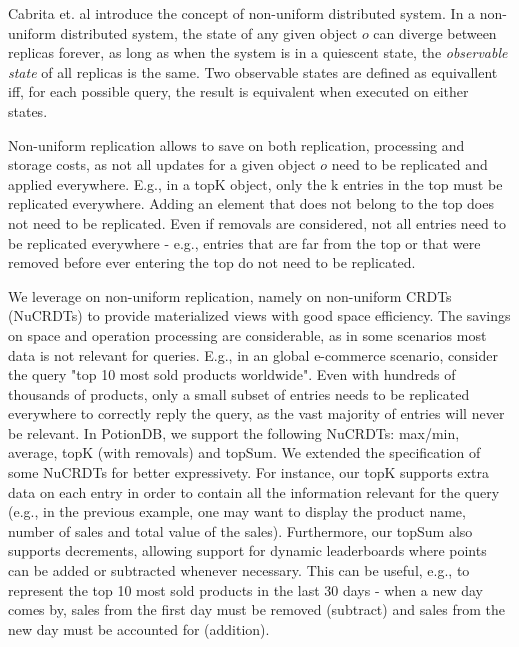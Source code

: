 \documentclass{vldb}
\begin{document}
Cabrita et. al \cite{Cabrita17Nonuniform} introduce the concept of non-uniform distributed system.
In a non-uniform distributed system, the state of any given object $o$ can diverge between replicas forever, as long as when the system is in a quiescent state, the \emph{observable state} of all replicas is the same.
Two observable states are defined as equivallent iff, for each possible query, the result is equivalent when executed on either states.

Non-uniform replication allows to save on both replication, processing and storage costs, as not all updates for a given object $o$ need to be replicated and applied everywhere.
E.g., in a topK object, only the k entries in the top must be replicated everywhere.
Adding an element that does not belong to the top does not need to be replicated.
Even if removals are considered, not all entries need to be replicated everywhere - e.g., entries that are far from the top or that were removed before ever entering the top do not need to be replicated.

We leverage on non-uniform replication, namely on non-uniform CRDTs (NuCRDTs) to provide materialized views with good space efficiency.
The savings on space and operation processing are considerable, as in some scenarios most data is not relevant for queries.
E.g., in an global e-commerce scenario, consider the query "top 10 most sold products worldwide".
Even with hundreds of thousands of products, only a small subset of entries needs to be replicated everywhere to correctly reply the query, as the vast majority of entries will never be relevant.
In PotionDB, we support the following NuCRDTs: max/min, average, topK (with removals) and topSum.
We extended the specification of some NuCRDTs for better expressivety.
For instance, our topK supports extra data on each entry in order to contain all the information relevant for the query (e.g., in the previous example, one may want to display the product name, number of sales and total value of the sales).
Furthermore, our topSum also supports decrements, allowing support for dynamic leaderboards where points can be added or subtracted whenever necessary.
This can be useful, e.g., to represent the top 10 most sold products in the last 30 days - when a new day comes by, sales from the first day must be removed (subtract) and sales from the new day must be accounted for (addition).
\end{document}
